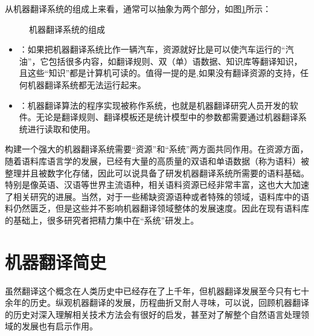 \parinterval 从机器翻译系统的组成上来看，通常可以抽象为两个部分，如图\ref{fig:1-2}所示：

\begin{figure}[htp]
    \centering

    \caption{机器翻译系统的组成}
    \label{fig:1-2}
\end{figure}

\begin{itemize}
\vspace{0.5em}
\item {\small{}}：如果把机器翻译系统比作一辆汽车，资源就好比是可以使汽车运行的“汽油”，它包括很多内容，如翻译规则、双（单）语数据、知识库等翻译知识，且这些“知识”都是计算机可读的。值得一提的是,如果没有翻译资源的支持，任何机器翻译系统都无法运行起来。
\vspace{0.5em}
\item {\small{}}：机器翻译算法的程序实现被称作系统，也就是机器翻译研究人员开发的软件。无论是翻译规则、翻译模板还是统计模型中的参数都需要通过机器翻译系统进行读取和使用。
\vspace{0.5em}
\end{itemize}

\parinterval 构建一个强大的机器翻译系统需要“资源”和“系统”两方面共同作用。在资源方面，随着语料库语言学的发展，已经有大量的高质量的双语和单语数据（称为语料）被整理并且被数字化存储，因此可以说具备了研发机器翻译系统所需要的语料基础。特别是像英语、汉语等世界主流语种，相关语料资源已经非常丰富，这也大大加速了相关研究的进展。当然，对于一些稀缺资源语种或者特殊的领域，语料库中的语料仍然匮乏，但是这些并不影响机器翻译领域整体的发展速度。因此在现有语料库的基础上，很多研究者把精力集中在“系统”研发上。


\sectionnewpage
\section{机器翻译简史}

\parinterval 虽然翻译这个概念在人类历史中已经存在了上千年，但机器翻译发展至今只有七十余年的历史。纵观机器翻译的发展，历程曲折又耐人寻味，可以说，回顾机器翻译的历史对深入理解相关技术方法会有很好的启发，甚至对了解整个自然语言处理领域的发展也有启示作用。

